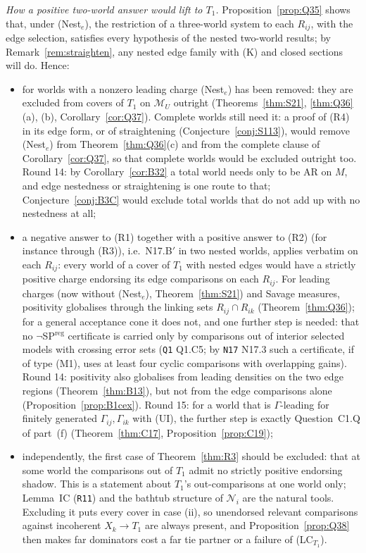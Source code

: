 \documentclass[11pt]{article}
\theoremstyle{definition}
\theoremstyle{remark}
\newcommand{\M}{\mathcal M}
\newcommand{\src}[1]{\texttt{#1}}
\begin{document}
\emph{How a positive two-world answer would lift to $T_1$.} Proposition~\ref{prop:Q35} shows that, under (Nest$_e$), the restriction of a three-world system to each $R_{ij}$, with the edge selection, satisfies every hypothesis of the nested two-world results; by Remark~\ref{rem:straighten}, any nested edge family with (K) and closed sections will do. Hence:
\begin{itemize}[leftmargin=*]
\item for worlds with a nonzero leading charge (Nest$_e$) has been removed: they are excluded from covers of $T_1$ on $\M_U$ outright (Theorems~\ref{thm:S21}, \ref{thm:Q36}(a), (b), Corollary~\ref{cor:Q37}). Complete worlds still need it: a proof of (R4) in its edge form, or of straightening (Conjecture~\ref{conj:S113}), would remove (Nest$_e$) from Theorem~\ref{thm:Q36}(c) and from the complete clause of Corollary~\ref{cor:Q37}, so that complete worlds would be excluded outright too. Round 14: by Corollary~\ref{cor:B32} a total world needs only to be AR on $M$, and edge nestedness or straightening is one route to that; Conjecture~\ref{conj:B3C} would exclude total worlds that do not add up with no nestedness at all;
\item a negative answer to (R1) together with a positive answer to (R2) (for instance through (R3)), i.e.\ N17.B$'$ in two nested worlds, applies verbatim on each $R_{ij}$: every world of a cover of $T_1$ with nested edges would have a strictly positive charge endorsing its edge comparisons on each $R_{ij}$. For leading charges (now without (Nest$_e$), Theorem~\ref{thm:S21}) and Savage measures, positivity globalises through the linking sets $R_{ij}\cap R_{ik}$ (Theorem~\ref{thm:Q36}); for a general acceptance cone it does not, and one further step is needed: that no $\neg$SP$^{\mathrm{reg}}$ certificate is carried only by comparisons out of interior selected models with crossing error sets (\src{Q1} Q1.C5; by \src{N17} N17.3 such a certificate, if of type (M1), uses at least four cyclic comparisons with overlapping gains). Round 14: positivity also globalises from leading densities on the two edge regions (Theorem~\ref{thm:B13}), but not from the edge comparisons alone (Proposition~\ref{prop:B1cex}). Round 15: for a world that is $\Gamma$-leading for finitely generated $\Gamma_{ij},\Gamma_{ik}$ with (UI), the further step is exactly Question~C1.Q of part~(f) (Theorem~\ref{thm:C17}, Proposition~\ref{prop:C19});
\item independently, the first case of Theorem~\ref{thm:R3} should be excluded: that at some world the comparisons out of $T_1$ admit no strictly positive endorsing shadow. This is a statement about $T_1$'s out-comparisons at one world only; Lemma~IC (\src{R11}) and the bathtub structure of $\mathcal N_i$ are the natural tools. Excluding it puts every cover in case (ii), so unendorsed relevant comparisons against incoherent $X_k\to T_1$ are always present, and Proposition~\ref{prop:Q38} then makes far dominators cost a far tie partner or a failure of (LC$_{T_1}$).
\end{itemize}
\end{document}
